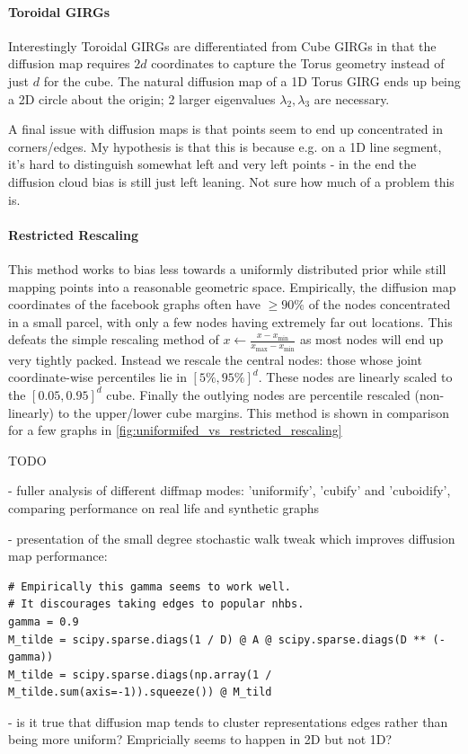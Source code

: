 \paragraph{Toroidal GIRGs} Interestingly Toroidal GIRGs are differentiated from Cube GIRGs in that the diffusion map requires $2d$ coordinates to capture the Torus geometry instead of just $d$ for the cube. The natural diffusion map of a 1D Torus GIRG ends up being a 2D circle about the origin; 2 larger eigenvalues $\lambda_2, \lambda_3$ are necessary. 


A final issue with diffusion maps is that points seem to end up concentrated in corners/edges. My hypothesis is that this is because e.g. on a 1D line segment, it's hard to distinguish somewhat left and very left points - in the end the diffusion cloud bias is still just left leaning. Not sure how much of a problem this is.

\paragraph{Restricted Rescaling} This method works to bias less towards a uniformly distributed prior while still mapping points into a reasonable geometric space.
Empirically, the diffusion map coordinates of the facebook graphs often have $\geq 90\%$ of the nodes concentrated in a small parcel, with only a few nodes having extremely far out locations.
This defeats the simple rescaling method of $x \gets \frac{x - x_{\min}}{x_{\max} - x_{\min}}$ as most nodes will end up very tightly packed. Instead we rescale the central nodes: those whose joint coordinate-wise percentiles lie in $[5\%, 95\%]^d$.
These nodes are linearly scaled to the $[0.05, 0.95]^d$ cube. Finally the outlying nodes are percentile rescaled (non-linearly) to the upper/lower cube margins.
This method is shown in comparison for a few graphs in \cref{fig:uniformifed_vs_restricted_rescaling}


TODO 

- fuller analysis of different diffmap modes: 'uniformify', 'cubify' and 'cuboidify', comparing performance on real life and synthetic graphs

- presentation of the small degree stochastic walk tweak which improves diffusion map performance:
\begin{verbatim}
# Empirically this gamma seems to work well. 
# It discourages taking edges to popular nhbs.
gamma = 0.9
M_tilde = scipy.sparse.diags(1 / D) @ A @ scipy.sparse.diags(D ** (-gamma))
M_tilde = scipy.sparse.diags(np.array(1 / M_tilde.sum(axis=-1)).squeeze()) @ M_tild
\end{verbatim}

- is it true that diffusion map tends to cluster representations edges rather than being more uniform? Empricially seems to happen in 2D but not 1D?

